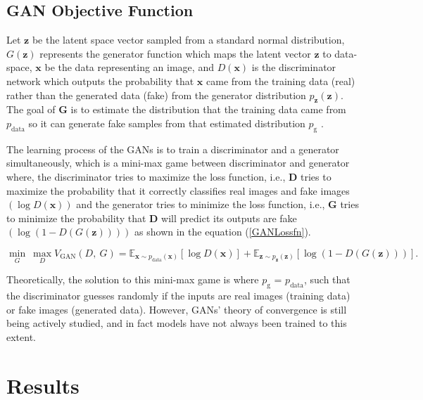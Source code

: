 \documentclass{article}
\begin{document}
\subsection*{GAN Objective Function}
Let $\boldsymbol{z}$ be the latent space vector sampled from a standard normal distribution, $G(\boldsymbol{z})$ represents the generator function which maps the latent vector $\boldsymbol{z}$ to data-space, $\boldsymbol{x}$ be the data representing an image, and $D(\boldsymbol{x})$ is the discriminator network which outputs the probability that $\boldsymbol{x}$ came from the training data (real) rather than the generated data (fake) from the generator distribution $p_{\boldsymbol{z}}(\boldsymbol{z})$. 
The goal of $\boldsymbol{G}$ is to estimate the distribution that the training data came from $p_{\text{data}}$ so it can generate fake samples from that estimated distribution $p_{\text{g}}$ \cite{goodfellow2014generative}. 
\par
The learning process of the GANs is to train a discriminator and a generator simultaneously, which is a mini-max game between discriminator and generator where, the discriminator tries to maximize the loss function, i.e., $\boldsymbol{D}$ tries to maximize the probability that it correctly classifies real images and fake images $(\log D(\boldsymbol{x}))$ and the generator tries to minimize the loss function, i.e., $\boldsymbol{G}$ tries to minimize the probability that $\boldsymbol{D}$ will predict its outputs are fake $(\log(1-D(G(\boldsymbol{z}))))$  as shown in the equation (\ref{GANLossfn}). 

\begin{equation} 
\min_{G}\ \max_{D}V_{\mathrm{GAN}}(D,\ G)=\mathbb{E}_{\boldsymbol{x}\sim p_{\text{data}}(\boldsymbol{x})}[\log D(\boldsymbol{x})] +\mathbb{E}_{\boldsymbol{z}\sim p_{\boldsymbol{z}}(\boldsymbol{z})}[\log(1-D(G(\boldsymbol{z})))]. 
\label{GANLossfn} 
\end{equation}

Theoretically, the solution to this mini-max game is where $p_{\text{g}}$ = $p_{\text{data}}$, such that the discriminator guesses randomly if the inputs are real images (training data) or fake images (generated data). However, GANs' theory of convergence is still being actively studied, and in fact models have not always been trained to this extent.





\section*{Results}
\end{document}
